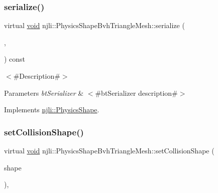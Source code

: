 \subsubsection{\texorpdfstring{serialize()}{serialize()}}
{\footnotesize\ttfamily virtual \mbox{\hyperlink{_thread_8h_af1e856da2e658414cb2456cb6f7ebc66}{void}} njli\+::\+Physics\+Shape\+Bvh\+Triangle\+Mesh\+::serialize (\begin{DoxyParamCaption}\item[{\mbox{\hyperlink{_thread_8h_af1e856da2e658414cb2456cb6f7ebc66}{void}} $\ast$}]{,  }\item[{bt\+Serializer $\ast$}]{ }\end{DoxyParamCaption}) const\hspace{0.3cm}{\ttfamily [virtual]}}

$<$\#\+Description\#$>$


\begin{DoxyParams}{Parameters}
{\em bt\+Serializer} & $<$\#bt\+Serializer description\#$>$ \\
\hline
\end{DoxyParams}


Implements \mbox{\hyperlink{classnjli_1_1_physics_shape_a2ac8a109a5ad67ee79f40ce8f28337cf}{njli\+::\+Physics\+Shape}}.

\mbox{\label{classnjli_1_1_physics_shape_bvh_triangle_mesh_a5aaf42224afb0773a280daddfa3c93d1}} 
\subsubsection{\texorpdfstring{set\+Collision\+Shape()}{setCollisionShape()}}
{\footnotesize\ttfamily virtual \mbox{\hyperlink{_thread_8h_af1e856da2e658414cb2456cb6f7ebc66}{void}} njli\+::\+Physics\+Shape\+Bvh\+Triangle\+Mesh\+::set\+Collision\+Shape (\begin{DoxyParamCaption}\item[{const bt\+Collision\+Shape \&}]{shape }\end{DoxyParamCaption})\hspace{0.3cm}{\ttfamily [protected]}, {\ttfamily [virtual]}}



